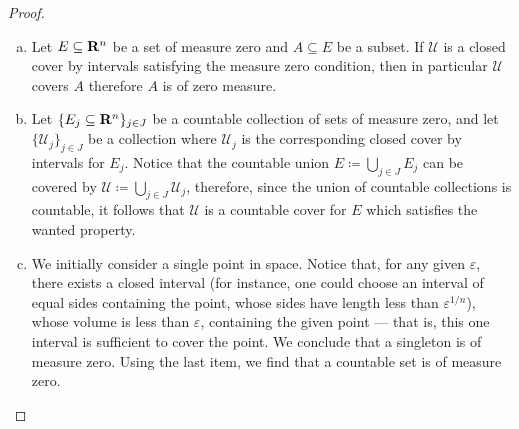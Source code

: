 \begin{proof}
    \begin{enumerate}[(a)]\setlength\itemsep{0em}
        \item Let \(E \subseteq \mathbf{R}^n\) be a set of measure zero and \(A \subseteq E\) be
              a subset. If \(\mathcal U\) is a closed cover by intervals satisfying the
              measure zero condition, then in particular \(\mathcal U\) covers \(A\)
              therefore \(A\) is of zero measure.

        \item Let \(\{E_{j} \subseteq \mathbf{R}^{n}\}_{j \in J}\) be a countable collection of
              sets of measure zero, and let \(\{\mathcal U_{j}\}_{j \in J}\) be a collection
              where \(\mathcal U_j\) is the corresponding closed cover by intervals for
              \(E_j\). Notice that the countable union \(E \coloneq \bigcup_{j \in J} E_j\)
              can be covered by \(\mathcal U \coloneq \bigcup_{j \in J} \mathcal U_j\),
              therefore, since the union of countable collections is countable, it follows
              that \(\mathcal U\) is a countable cover for \(E\) which satisfies the wanted
              property.

        \item We initially consider a single point in space. Notice that, for any given
              \(\varepsilon\), there exists a closed interval (for instance, one could
              choose an interval of equal sides containing the point, whose sides have
              length less than \(\varepsilon^{1/n}\)), whose volume is less than
              \(\varepsilon\), containing the given point --- that is, this one interval is
              sufficient to cover the point. We conclude that a singleton is of measure
              zero. Using the last item, we find that a countable set is of measure zero.


\end{enumerate}
\end{proof}
